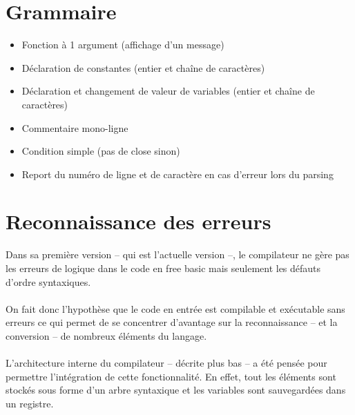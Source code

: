 \documentclass{article}
\begin{document}
\section{Grammaire}
\begin{itemize}
\item Fonction à 1 argument (affichage d'un message)
\item Déclaration de constantes (entier et chaîne de caractères)
\item Déclaration et changement de valeur de variables (entier et chaîne de caractères)
\item Commentaire mono-ligne
\item Condition simple (pas de close sinon)
\item Report du numéro de ligne et de caractère en cas d'erreur lors du parsing
\end{itemize}
	
\section{Reconnaissance des erreurs}
Dans sa première version -- qui est l'actuelle version --, le compilateur ne gère pas 
les erreurs de logique dans le code en free basic mais seulement les défauts d'ordre
syntaxiques.
\\\\
On fait donc l'hypothèse que le code en entrée est compilable et exécutable sans erreurs
ce qui permet de se concentrer d'avantage sur la reconnaissance -- et la conversion -- 
de nombreux éléments du langage.
\\\\
L'architecture interne du compilateur -- décrite plus bas -- a été pensée pour permettre
l'intégration de cette fonctionnalité. En effet, tout les éléments sont stockés sous forme
d'un arbre syntaxique et les variables sont sauvegardées dans un registre.	
	
\end{document}
